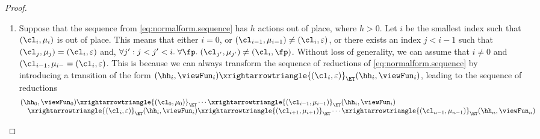 \begin{proof}
\begin{enumerate}
\item Suppose that the sequence from \cref{eq:normalform.sequence} has $h$ actions out of place, 
where $h > 0$. Let $i$ be the smallest index such that $(\cl_{i}, \mu_{i})$ is out of place. 
This means that either $i = 0$, or $(\cl_{i-1}, \mu_{i-1}) \neq (\cl_{i}, \varepsilon)$, 
or there exists an index $j < i -1 $ such that $(\cl_{j}, \mu_{j}) = (\cl_{i}, \varepsilon)$ 
and, $\forall j': j < j' < i.\;\forall \fp.\;(\cl_{j'}, \mu_{j'}) \neq (\cl_{i}, \fp)$. 
Without loss of generality, we can assume that $i \neq 0$ and $(\cl_{i-1}, \mu_{i-} = (\cl_{i}, \varepsilon)$. 
This is because we can always transform the sequence of reductions of \cref{eq:normalform.sequence} by 
introducing a transition of the form $(\hh_{i}, \viewFun_{i}) \xrightarrowtriangle{(\cl_{i}, \varepsilon)}_{\ET}
(\hh_{i}, \viewFun_{i})$, leading to the sequence of reductions
\[
\begin{array}{@{}l@{}}
(\hh_{0}, \viewFun_{0}) \xrightarrowtriangle{(\cl_{0}, \mu_{0})}_{\ET} \cdots \xrightarrowtriangle{(\cl_{i-1}, \mu_{i-1})}_{\ET}
(\hh_{i}, \viewFun_{i}) \\
\quad \xrightarrowtriangle{(\cl_{i}, \varepsilon)}_{\ET} (\hh_{i}, \viewFun_{i}) \xrightarrowtriangle{(\cl_{i+1}, \mu_{i+1})}_{\ET} 
\cdots \xrightarrowtriangle{(\cl_{n-1}, \mu_{n-1})}_{\ET} (\hh_{n}, \viewFun_{n})
\end{array}
\]


\end{enumerate}
\end{proof}
